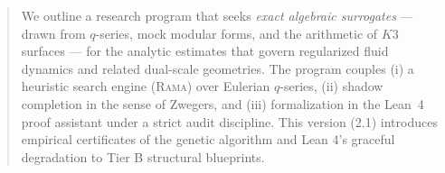\begin{center}
\end{center}

\begin{abstract}
\noindent We outline a research program that seeks \emph{exact algebraic
surrogates} --- drawn from $q$-series, mock modular forms, and the arithmetic
of $K3$ surfaces --- for the analytic estimates that govern regularized fluid
dynamics and related dual-scale geometries. The program couples (i) a
heuristic search engine (\textsc{Rama}) over Eulerian $q$-series, (ii) shadow
completion in the sense of Zwegers, and (iii) formalization in the Lean~4
proof assistant under a strict audit discipline. This version (2.1) introduces empirical certificates of the genetic algorithm and Lean 4's graceful degradation to Tier B structural blueprints.
\end{abstract}
